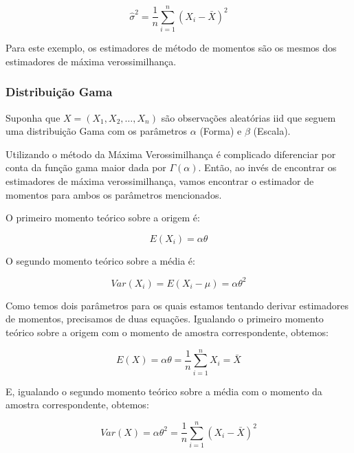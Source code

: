 \begin{equation}
	\hat{\sigma}^2=\dfrac{1}{n}\sum\limits_{i=1}^n( X_i-\bar{X})^2
\end{equation}

Para este exemplo, os estimadores de método de momentos são os mesmos dos estimadores de máxima verossimilhança.

\subsubsection{Distribuição Gama}

Suponha que \begin{math} X = (X_1, X_2, \dots, X_n) \end{math} são observações aleatórias iid que seguem uma distribuição Gama com os parâmetros $\alpha$ (Forma) e $\beta$ (Escala).

Utilizando o método da Máxima Verossimilhança é complicado diferenciar por conta da função gama maior dada por \begin{math} \Gamma(\alpha) \end{math}. Então, ao invés de encontrar os estimadores de máxima verossimilhança, vamos encontrar o estimador de momentos para ambos os parâmetros mencionados.

O primeiro momento teórico sobre a origem é: 

\begin{equation}
	E(X_i) = \alpha\theta
\end{equation}

O segundo momento teórico sobre a média é: 

\begin{equation}
	Var(X_i) = E(X_i - \mu) = \alpha\theta^2
\end{equation}

Como temos dois parâmetros para os quais estamos tentando derivar estimadores de momentos, precisamos de duas equações. Igualando o primeiro momento teórico sobre a origem com o momento de amostra correspondente, obtemos:

\begin{equation}
	E(X)=\alpha\theta=\dfrac{1}{n}\sum\limits_{i=1}^n X_i=\bar{X}
\end{equation}

E, igualando o segundo momento teórico sobre a média com o momento da amostra correspondente, obtemos:

\begin{equation}
	Var(X)=\alpha\theta^2=\dfrac{1}{n}\sum\limits_{i=1}^n (X_i-\bar{X})^2
\end{equation}

